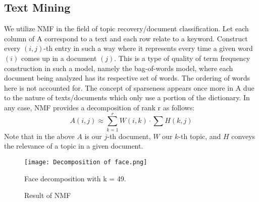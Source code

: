 \documentclass[
10pt, %
a4paper, %
oneside, %
headinclude,footinclude, %
BCOR5mm, %
]{scrartcl}
\begin{document}
\subsection{Text Mining}
We utilize NMF in the field of topic recovery/document classification.
Let each column of A correspond to a text and each row relate to a keyword.
Construct every $(i,j)$-th entry in such a way where it represents every time a given word $(i)$ comes up in a document $(j)$.
This is a type of quality of term frequency construction in such a model, namely the bag-of-words model, where each document being analyzed has its respective set of words.
The ordering of words here is not accounted for.
The concept of sparseness appears once more in A due to the nature of texts/documents which only use a portion of the dictionary.
In any case, NMF provides a decomposition of rank r as follows:
$$A(i,j)\approx\sum_{k=1}^{r}W(i,k)\cdot\sum H(k,j)$$
Note that in the above $A$ is our $j$-th document, $W$ our $k$-th topic, and $H$ conveys the relevance of a topic in a given document.

\begin{figure}[tb]
    \centering
    \texttt{[image: Decomposition of face.png]}
    \caption[Face Decomposition Using NMF]{Face decomposition with k = 49.}
    \label{fig:facedecomp}
\end{figure}

\begin{figure}[tb]
    \centering
    \caption{Result of NMF}
    \label{fig:application}
\end{figure}




\end{document}
